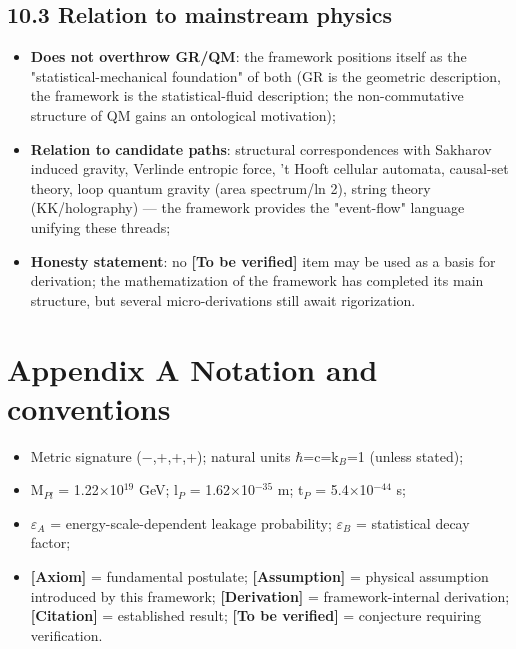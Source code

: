 \documentclass[12pt]{article}
\newcommand{\mtag}[1]{\textbf{[#1]}}
\newcommand{\up}[1]{\ensuremath{^{#1}}}
\newcommand{\down}[1]{\ensuremath{_{#1}}}
\begin{document}
\subsection{10.3 Relation to mainstream physics}

\begin{itemize}
\item \textbf{Does not overthrow GR/QM}: the framework positions itself as the "statistical-mechanical foundation" of both (GR is the geometric description, the framework is the statistical-fluid description; the non-commutative structure of QM gains an ontological motivation);
\item \textbf{Relation to candidate paths}: structural correspondences with Sakharov induced gravity, Verlinde entropic force, 't Hooft cellular automata, causal-set theory, loop quantum gravity (area spectrum/ln 2), string theory (KK/holography) --- the framework provides the "event-flow" language unifying these threads;
\item \textbf{Honesty statement}: no \mtag{To be verified} item may be used as a basis for derivation; the mathematization of the framework has completed its main structure, but several micro-derivations still await rigorization.
\end{itemize}



\section*{Appendix A Notation and conventions}

\begin{itemize}
\item Metric signature (\ensuremath{-},+,+,+); natural units \ensuremath{\hbar}=c=k\down{B}=1 (unless stated);
\item M\down{Pl} = 1.22\ensuremath{\times}10\up{19} GeV; l\down{P} = 1.62\ensuremath{\times}10\up{-35} m; t\down{P} = 5.4\ensuremath{\times}10\up{-44} s;
\item \ensuremath{\varepsilon}\down{A} = energy-scale-dependent leakage probability; \ensuremath{\varepsilon}\down{B} = statistical decay factor;
\item \mtag{Axiom} = fundamental postulate; \mtag{Assumption} = physical assumption introduced by this framework; \mtag{Derivation} = framework-internal derivation; \mtag{Citation} = established result; \mtag{To be verified} = conjecture requiring verification.
\end{itemize}
\end{document}
